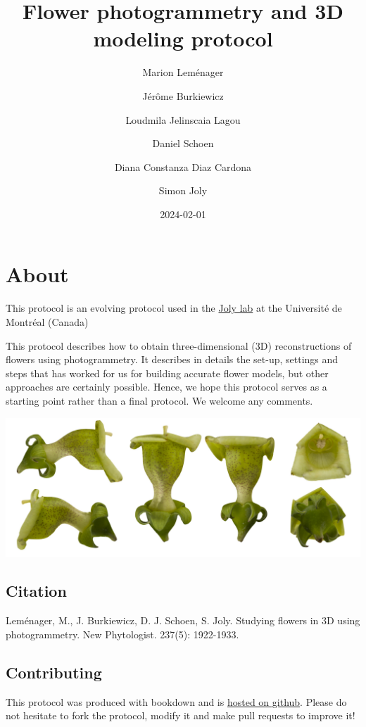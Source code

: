 \documentclass[
]{book}
\title{Flower photogrammetry and 3D modeling protocol}
\author{Marion Leménager \and Jérôme Burkiewicz \and Loudmila Jelinscaia Lagou \and Daniel Schoen \and Diana Constanza Diaz Cardona \and Simon Joly}
\date{2024-02-01}
\begin{document}
\maketitle

{
\setcounter{tocdepth}{1}
\tableofcontents
}
\hypertarget{about}{%
\chapter{About}\label{about}}

This protocol is an evolving protocol used in the \href{www.plantevolution.org}{Joly lab} at the Université de Montréal (Canada)

This protocol describes how to obtain three-dimensional (3D) reconstructions of flowers using photogrammetry. It describes in details the set-up, settings and steps that has worked for us for building accurate flower models, but other approaches are certainly possible. Hence, we hope this protocol serves as a starting point rather than a final protocol. We welcome any comments.

\includegraphics[width=1\textwidth,height=\textheight]{Figures/cover.jpg}

\hypertarget{citation}{%
\section{Citation}\label{citation}}

Leménager, M., J. Burkiewicz, D. J. Schoen, S. Joly. Studying flowers in 3D using photogrammetry. New Phytologist. 237(5): 1922-1933.

\hypertarget{contributing}{%
\section{Contributing}\label{contributing}}

This protocol was produced with bookdown and is \href{https://github.com/plantevolution/photogrammetry-protocol}{hosted on github}. Please do not hesitate to fork the protocol, modify it and make pull requests to improve it!
\end{document}
